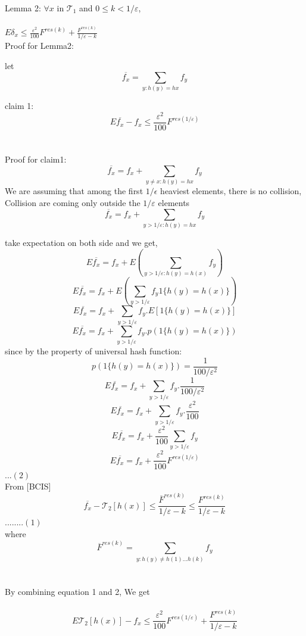 \documentclass{article}
\begin{document}
\begin{multicols}{2}
{	  Lemma 2: $\forall x$ in $\mathcal{T}_{1}$ and $0\leq k < 1/\varepsilon$,\\
	  \\
	 \hspace*{1cm} $E\delta_x \leq \frac{\varepsilon^2}{100}F^{res(k)} + \frac{F^{res(k)}}{1/\varepsilon-k}$\\
	 
	 Proof for Lemma2:
	
	let $$\overline{f_x}=\sum_{y:h(y)=h{x}}f_y$$
	
	claim 1: $$E\overline{f_x}-f_x \leq \frac{\varepsilon^2}{100}F^{res(1/\varepsilon)}$$\\
	\\
	Proof for claim1: $$\overline{f_x}= f_x +\sum_{y\neq x:h(y)=h{x}}f_y$$
	We are assuming that among the first $1/\epsilon$ heaviest elements, there is no collision, Collision are coming only outside the $1/\varepsilon$ elements\\
	 $$\overline{f_x}= f_x +\sum_{y>1/\varepsilon:h(y)=h{x}}f_y$$
	 
	 take expectation on  both side and we get,\\
	  $$E\overline{f_x}=f_x+E(\sum_{y>1/\varepsilon:h(y)=h(x)}f_y)$$	
	  $$E\overline{f_x}=f_x+E(\sum_{y>1/\varepsilon}f_y 1\{h(y)=h(x)\})$$
	  $$E\overline{f_x}=f_x+\sum_{y>1/\varepsilon}f_y .E[1\{h(y)=h(x)\}]$$
	  $$E\overline{f_x}=f_x+\sum_{y>1/\varepsilon}f_y. p(1\{h(y)=h(x)\})$$	
	  since by the property of universal hash function: $$p(1\{h(y)=h(x)\})=\frac{1}{100/\varepsilon^2}$$
	  $$E\overline{f_x}=f_x+\sum_{y>1/\varepsilon}f_y. \frac{1}{100/\varepsilon^2}$$
	  $$E\overline{f_x}=f_x+\sum_{y>1/\varepsilon}f_y. \frac{\varepsilon^2}{100}$$
	  $$E\overline{f_x}=f_x+\frac{\varepsilon^2}{100}\sum_{y>1/\varepsilon}f_y$$
	  $$E\overline{f_x}=f_x+\frac{\varepsilon^2}{100}F^{res(1/\varepsilon)}$$...$(2)$
	  \\
	  From [BCIS]
	   $$\overline{f_x}-\mathcal{T}_{2}[h(x)] \leq \frac {\overline{F}^{res(k)}}{1/\varepsilon-k} \leq \frac{F^{res(k)}}{1/\varepsilon-k}$$ ........$(1)$ 	  
	                \\                            
	   where $$\overline{F}^{res(k)}=\sum_{y:h(y)\neq h(1)...h(k)}f_y$$\\
	\\
	   By combining equation 1 and 2, We get\\
	   \\
	   $$E\mathcal{T}_{2}[h(x)]-f_x \leq \frac{\varepsilon^2}{100}F^{res(1/\varepsilon)}+\frac{F^{res(k)}}{1/\varepsilon-k}$$
	}


\end{multicols}
\end{document}
